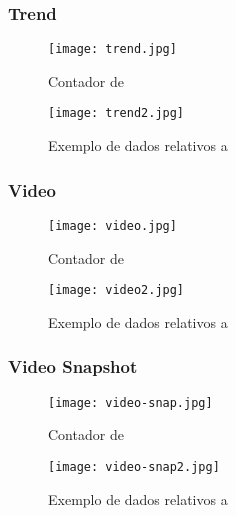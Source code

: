 \subsubsection{Trend}

\begin{figure}[H]
  \centering
  \begin{minipage}[b]{0.25\textwidth}
      \centering
      \texttt{[image: trend.jpg]}
      \caption{Contador de }
  \end{minipage}
  \hspace{0.05\textwidth}
  \begin{minipage}[b]{0.6\textwidth}
      \centering
      \texttt{[image: trend2.jpg]}
      \caption{Exemplo de dados relativos a }
  \end{minipage}
\end{figure}

\subsubsection{Video}

\begin{figure}[H]
  \centering
  \begin{minipage}[b]{0.25\textwidth}
      \centering
      \texttt{[image: video.jpg]}
      \caption{Contador de }
  \end{minipage}
  \hspace{0.05\textwidth}
  \begin{minipage}[b]{0.6\textwidth}
      \centering
      \texttt{[image: video2.jpg]}
      \caption{Exemplo de dados relativos a }
  \end{minipage}
\end{figure}

\subsubsection{Video Snapshot}

\begin{figure}[H]
  \centering
  \texttt{[image: video-snap.jpg]}
  \caption{Contador de }
\end{figure}

\begin{figure}[H]
  \centering
  \texttt{[image: video-snap2.jpg]}
  \caption{Exemplo de dados relativos a }
\end{figure}
